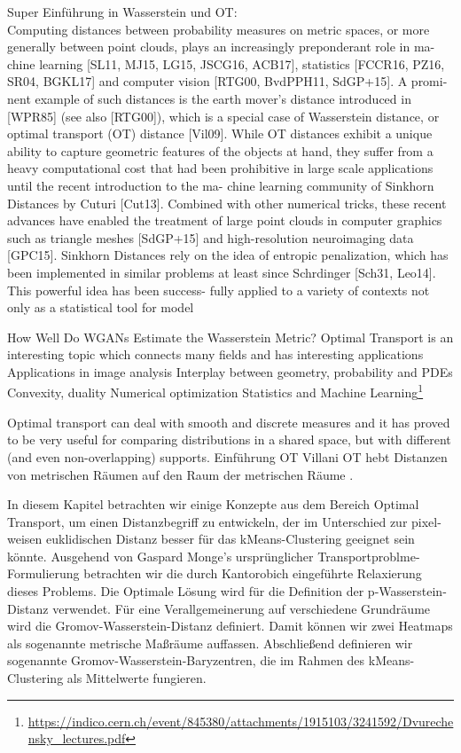 \documentclass[11pt,a4paper]{article}
\numberwithin{equation}{section}
\begin{document}
	Super Einführung in Wasserstein und OT: \cite{altschuler2017near}\\
	Computing distances between probability measures on metric spaces, or more
	generally between point clouds, plays an increasingly preponderant role in ma-
	chine learning [SL11, MJ15, LG15, JSCG16, ACB17], statistics [FCCR16, PZ16,
	SR04, BGKL17] and computer vision [RTG00, BvdPPH11, SdGP+15]. A promi-
	nent example of such distances is the earth mover’s distance introduced in [WPR85]
	(see also [RTG00]), which is a special case of Wasserstein distance, or optimal
	transport (OT) distance [Vil09].
	While OT distances exhibit a unique ability to capture geometric features of
	the objects at hand, they suffer from a heavy computational cost that had been
	prohibitive in large scale applications until the recent introduction to the ma-
	chine learning community of Sinkhorn Distances by Cuturi [Cut13]. Combined
	with other numerical tricks, these recent advances have enabled the treatment
	of large point clouds in computer graphics such as triangle meshes [SdGP+15]
	and high-resolution neuroimaging data [GPC15]. Sinkhorn Distances rely on the
	idea of entropic penalization, which has been implemented in similar problems
	at least since Schrdinger [Sch31, Leo14]. This powerful idea has been success-
	fully applied to a variety of contexts not only as a statistical tool for model
	
	
	How Well Do WGANs Estimate the
	Wasserstein Metric? \cite{mallasto2019well}
	Optimal Transport is an interesting topic which connects many fields and has
	interesting applications
	Applications in image analysis
	Interplay between geometry, probability and PDEs
	Convexity, duality
	Numerical optimization
	Statistics and Machine Learning\footnote{\url{https://indico.cern.ch/event/845380/attachments/1915103/3241592/Dvurechensky_lectures.pdf}}
	
	Optimal transport can deal with smooth and discrete measures and it has proved to be very useful
	for comparing distributions in a shared space, but with different (and even non-overlapping) supports\cite{vayer2020fused}.
	Einführung OT Villani%
	OT hebt Distanzen von metrischen Räumen auf den Raum der metrischen Räume \cite{memoli2011gromov}.
	
	In diesem Kapitel betrachten wir einige Konzepte aus dem Bereich Optimal Transport, um einen Distanzbegriff zu entwickeln, der im Unterschied zur pixel-weisen euklidischen Distanz besser für das kMeans-Clustering geeignet sein könnte.
	Ausgehend von Gaspard Monge's ursprünglicher Transportproblme-Formulierung betrachten wir die durch Kantorobich eingeführte Relaxierung dieses Problems.
	Die Optimale Lösung wird für die Definition der p-Wasserstein-Distanz verwendet.
	Für eine Verallgemeinerung auf verschiedene Grundräume wird die Gromov-Wasserstein-Distanz definiert. Damit können wir zwei Heatmaps als sogenannte metrische Maßräume auffassen.
	Abschließend definieren wir sogenannte Gromov-Wasserstein-Baryzentren, die im Rahmen des kMeans-Clustering als Mittelwerte fungieren.
	
\end{document}
